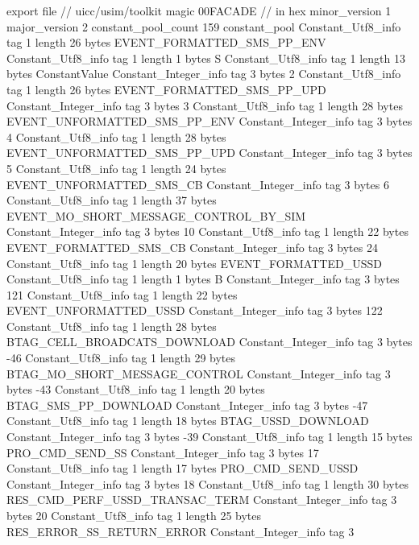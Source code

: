 export file {		// uicc/usim/toolkit
	magic	00FACADE		 // in hex
	minor_version	1
	major_version	2
	constant_pool_count	159
	constant_pool {
		Constant_Utf8_info {
			tag	1
			length	26
			bytes	EVENT_FORMATTED_SMS_PP_ENV
		}
		Constant_Utf8_info {
			tag	1
			length	1
			bytes	S
		}
		Constant_Utf8_info {
			tag	1
			length	13
			bytes	ConstantValue
		}
		Constant_Integer_info {
			tag	3
			bytes	2
		}
		Constant_Utf8_info {
			tag	1
			length	26
			bytes	EVENT_FORMATTED_SMS_PP_UPD
		}
		Constant_Integer_info {
			tag	3
			bytes	3
		}
		Constant_Utf8_info {
			tag	1
			length	28
			bytes	EVENT_UNFORMATTED_SMS_PP_ENV
		}
		Constant_Integer_info {
			tag	3
			bytes	4
		}
		Constant_Utf8_info {
			tag	1
			length	28
			bytes	EVENT_UNFORMATTED_SMS_PP_UPD
		}
		Constant_Integer_info {
			tag	3
			bytes	5
		}
		Constant_Utf8_info {
			tag	1
			length	24
			bytes	EVENT_UNFORMATTED_SMS_CB
		}
		Constant_Integer_info {
			tag	3
			bytes	6
		}
		Constant_Utf8_info {
			tag	1
			length	37
			bytes	EVENT_MO_SHORT_MESSAGE_CONTROL_BY_SIM
		}
		Constant_Integer_info {
			tag	3
			bytes	10
		}
		Constant_Utf8_info {
			tag	1
			length	22
			bytes	EVENT_FORMATTED_SMS_CB
		}
		Constant_Integer_info {
			tag	3
			bytes	24
		}
		Constant_Utf8_info {
			tag	1
			length	20
			bytes	EVENT_FORMATTED_USSD
		}
		Constant_Utf8_info {
			tag	1
			length	1
			bytes	B
		}
		Constant_Integer_info {
			tag	3
			bytes	121
		}
		Constant_Utf8_info {
			tag	1
			length	22
			bytes	EVENT_UNFORMATTED_USSD
		}
		Constant_Integer_info {
			tag	3
			bytes	122
		}
		Constant_Utf8_info {
			tag	1
			length	28
			bytes	BTAG_CELL_BROADCATS_DOWNLOAD
		}
		Constant_Integer_info {
			tag	3
			bytes	-46
		}
		Constant_Utf8_info {
			tag	1
			length	29
			bytes	BTAG_MO_SHORT_MESSAGE_CONTROL
		}
		Constant_Integer_info {
			tag	3
			bytes	-43
		}
		Constant_Utf8_info {
			tag	1
			length	20
			bytes	BTAG_SMS_PP_DOWNLOAD
		}
		Constant_Integer_info {
			tag	3
			bytes	-47
		}
		Constant_Utf8_info {
			tag	1
			length	18
			bytes	BTAG_USSD_DOWNLOAD
		}
		Constant_Integer_info {
			tag	3
			bytes	-39
		}
		Constant_Utf8_info {
			tag	1
			length	15
			bytes	PRO_CMD_SEND_SS
		}
		Constant_Integer_info {
			tag	3
			bytes	17
		}
		Constant_Utf8_info {
			tag	1
			length	17
			bytes	PRO_CMD_SEND_USSD
		}
		Constant_Integer_info {
			tag	3
			bytes	18
		}
		Constant_Utf8_info {
			tag	1
			length	30
			bytes	RES_CMD_PERF_USSD_TRANSAC_TERM
		}
		Constant_Integer_info {
			tag	3
			bytes	20
		}
		Constant_Utf8_info {
			tag	1
			length	25
			bytes	RES_ERROR_SS_RETURN_ERROR
		}
		Constant_Integer_info {
			tag	3
}}}
